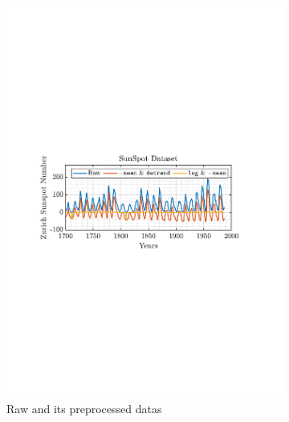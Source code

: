\documentclass[12pt]{article}
\begin{document}
	\begin{figure}[H]
		\centering
		\begin{subfigure}{0.49\textwidth}
			\centering
			\includegraphics[trim={2.2cm 11.2cm 3.15cm  11.2cm}, clip, width=\textwidth]{../MATLAB/figures/q1_2a_fig01.pdf} 
			\captionsetup{justification=centering}
			\caption{Raw and its preprocessed datas}
		\end{subfigure}
		\begin{subfigure}{0.49\textwidth}
			\centering

\end{subfigure}
\end{figure}
\end{document}
